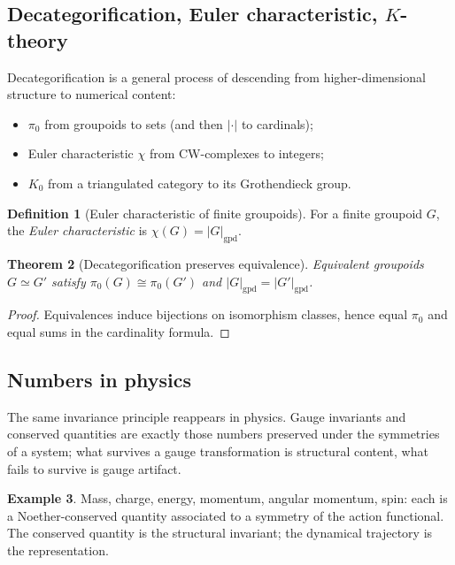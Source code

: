 \documentclass[12pt]{article}
\newtheorem{theorem}{Theorem}[section]
\theoremstyle{definition}
\newtheorem{definition}[theorem]{Definition}
\newtheorem{example}[theorem]{Example}
\theoremstyle{remark}
\newcommand{\eq}{\simeq}
\newcommand{\iso}{\cong}
\begin{document}
\subsection{Decategorification, Euler characteristic, $K$-theory}

Decategorification is a general process of descending from higher-dimensional structure to numerical content:
\begin{itemize}
  \item $\pi_0$ from groupoids to sets (and then $|\cdot|$ to cardinals);
  \item Euler characteristic $\chi$ from CW-complexes to integers;
  \item $K_0$ from a triangulated category to its Grothendieck group.
\end{itemize}

\begin{definition}[Euler characteristic of finite groupoids]\label{def:euler-gpd}
For a finite groupoid $G$, the \emph{Euler characteristic} is $\chi(G) = |G|_{\mathrm{gpd}}$.
\end{definition}

\begin{theorem}[Decategorification preserves equivalence]
Equivalent groupoids $G \eq G'$ satisfy $\pi_0(G) \iso \pi_0(G')$ and $|G|_{\mathrm{gpd}} = |G'|_{\mathrm{gpd}}$.
\end{theorem}

\begin{proof}
Equivalences induce bijections on isomorphism classes, hence equal $\pi_0$ and equal sums in the cardinality formula.
\end{proof}

\subsection{Numbers in physics}

The same invariance principle reappears in physics. Gauge invariants and conserved quantities are exactly those numbers preserved under the symmetries of a system; what survives a gauge transformation is structural content, what fails to survive is gauge artifact.

\begin{example}
Mass, charge, energy, momentum, angular momentum, spin: each is a Noether-conserved quantity associated to a symmetry of the action functional. The conserved quantity is the structural invariant; the dynamical trajectory is the representation.
\end{example}
\end{document}
